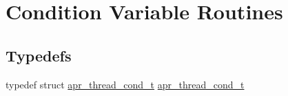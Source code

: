 \hypertarget{group__apr__thread__cond}{\section{Condition Variable Routines}
\label{group__apr__thread__cond}
}
\subsection*{Typedefs}
\begin{DoxyCompactItemize}
\item 
typedef struct \hyperlink{group__apr__thread__cond_gae8f918d38bf1c58bc09670eee456ae5e}{apr\-\_\-thread\-\_\-cond\-\_\-t} \hyperlink{group__apr__thread__cond_gae8f918d38bf1c58bc09670eee456ae5e}{apr\-\_\-thread\-\_\-cond\-\_\-t}
\end{DoxyCompactItemize}
